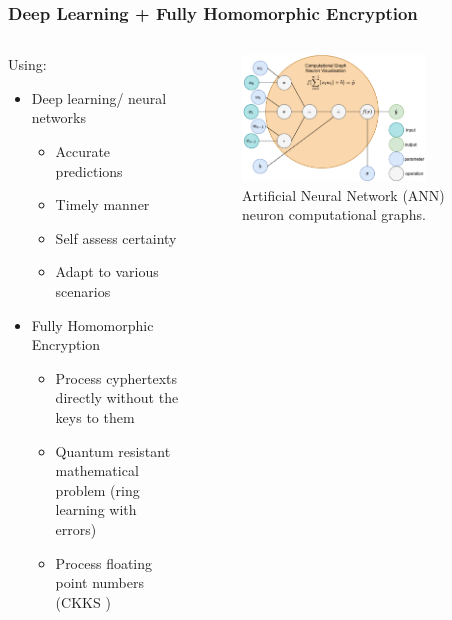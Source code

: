 \documentclass[aspectratio=169]{beamer}
\begin{document}
  \begin{frame}
    \frametitle{Deep Learning + Fully Homomorphic Encryption}
    \begin{columns}
      \begin{column}{0.5\textwidth}
        Using:
        \begin{itemize}
          \item Deep learning/ neural networks
          \begin{itemize}
            \item Accurate predictions
            \item Timely manner
            \item Self assess certainty
            \item Adapt to various scenarios
          \end{itemize}
          \item Fully Homomorphic Encryption
          \begin{itemize}
            \item Process cyphertexts directly without the keys to them
            \item Quantum resistant mathematical problem (ring learning with errors)
            \item Process floating point numbers (CKKS \autocite{ckks})
          \end{itemize}
        \end{itemize}
      \end{column}
      \begin{column}{0.5\textwidth}
        \begin{figure}[th!]
          \centering
          \includegraphics[width=0.8\textwidth]{neuron_computational_graph.pdf}
          \caption{Artificial Neural Network (ANN) neuron computational graphs. \autocite{repository}}
          \label{fig:ann_cg}
        \end{figure}
      \end{column}
    \end{columns}
  \end{frame}
\end{document}

